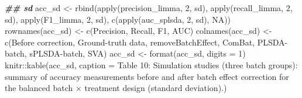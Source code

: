\documentclass[
]{book}
\newenvironment{Shaded}{\begin{snugshade}}{\end{snugshade}}
\newcommand{\AttributeTok}[1]{\textcolor[rgb]{0.77,0.63,0.00}{#1}}
\newcommand{\ConstantTok}[1]{\textcolor[rgb]{0.00,0.00,0.00}{#1}}
\newcommand{\DecValTok}[1]{\textcolor[rgb]{0.00,0.00,0.81}{#1}}
\newcommand{\DocumentationTok}[1]{\textcolor[rgb]{0.56,0.35,0.01}{\textbf{\textit{#1}}}}
\newcommand{\FunctionTok}[1]{\textcolor[rgb]{0.00,0.00,0.00}{#1}}
\newcommand{\NormalTok}[1]{#1}
\newcommand{\OtherTok}[1]{\textcolor[rgb]{0.56,0.35,0.01}{#1}}
\newcommand{\SpecialCharTok}[1]{\textcolor[rgb]{0.00,0.00,0.00}{#1}}
\newcommand{\StringTok}[1]{\textcolor[rgb]{0.31,0.60,0.02}{#1}}
\begin{document}
\begin{Shaded}
\begin{Highlighting}[]
\DocumentationTok{\#\# sd}
\NormalTok{acc\_sd }\OtherTok{\textless{}{-}} \FunctionTok{rbind}\NormalTok{(}\FunctionTok{apply}\NormalTok{(precision\_limma, }\DecValTok{2}\NormalTok{, sd), }\FunctionTok{apply}\NormalTok{(recall\_limma, }\DecValTok{2}\NormalTok{, sd), }
                \FunctionTok{apply}\NormalTok{(F1\_limma, }\DecValTok{2}\NormalTok{, sd), }\FunctionTok{c}\NormalTok{(}\FunctionTok{apply}\NormalTok{(auc\_splsda, }\DecValTok{2}\NormalTok{, sd), }\ConstantTok{NA}\NormalTok{))}
\FunctionTok{rownames}\NormalTok{(acc\_sd) }\OtherTok{\textless{}{-}} \FunctionTok{c}\NormalTok{(}\StringTok{\textquotesingle{}Precision\textquotesingle{}}\NormalTok{, }\StringTok{\textquotesingle{}Recall\textquotesingle{}}\NormalTok{, }\StringTok{\textquotesingle{}F1\textquotesingle{}}\NormalTok{, }\StringTok{\textquotesingle{}AUC\textquotesingle{}}\NormalTok{)}
\FunctionTok{colnames}\NormalTok{(acc\_sd) }\OtherTok{\textless{}{-}} \FunctionTok{c}\NormalTok{(}\StringTok{\textquotesingle{}Before correction\textquotesingle{}}\NormalTok{, }\StringTok{\textquotesingle{}Ground{-}truth data\textquotesingle{}}\NormalTok{, }
                      \StringTok{\textquotesingle{}removeBatchEffect\textquotesingle{}}\NormalTok{, }\StringTok{\textquotesingle{}ComBat\textquotesingle{}}\NormalTok{, }
                      \StringTok{\textquotesingle{}PLSDA{-}batch\textquotesingle{}}\NormalTok{, }\StringTok{\textquotesingle{}sPLSDA{-}batch\textquotesingle{}}\NormalTok{, }\StringTok{\textquotesingle{}SVA\textquotesingle{}}\NormalTok{)}
\NormalTok{acc\_sd }\OtherTok{\textless{}{-}} \FunctionTok{format}\NormalTok{(acc\_sd, }\AttributeTok{digits =} \DecValTok{1}\NormalTok{)}
\NormalTok{knitr}\SpecialCharTok{::}\FunctionTok{kable}\NormalTok{(acc\_sd, }\AttributeTok{caption =} \StringTok{\textquotesingle{}Table 10: Simulation studies (three batch groups): summary of accuracy measurements before and after batch effect correction for the balanced batch × treatment design (standard deviation).\textquotesingle{}}\NormalTok{)}
\end{Highlighting}
\end{Shaded}
\end{document}
